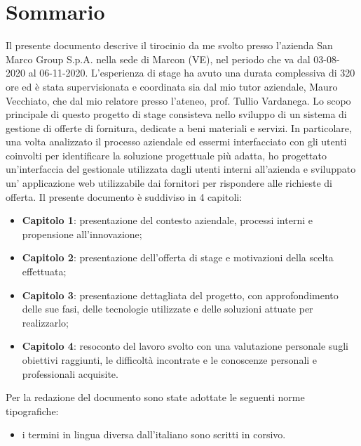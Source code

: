 
\cleardoublepage
{}
{}
\begingroup
\let\clearpage\relax
\let\cleardoublepage\relax
\let\cleardoublepage\relax

\chapter*{Sommario}

Il presente documento descrive il tirocinio da me svolto presso l'azienda San Marco Group S.p.A. nella sede di Marcon (VE), nel periodo che va dal 03-08-2020 al 06-11-2020. L'esperienza di stage ha avuto una durata complessiva di 320 ore ed è stata supervisionata e coordinata sia dal mio tutor aziendale, Mauro Vecchiato, che dal mio relatore presso l'ateneo, prof. Tullio Vardanega. Lo scopo principale di questo progetto di stage consisteva nello sviluppo di un sistema di gestione di offerte di fornitura, dedicate a beni materiali e servizi. In particolare, una volta analizzato il processo aziendale ed essermi interfacciato con gli utenti coinvolti per identificare la soluzione progettuale più adatta, ho progettato un'interfaccia del gestionale utilizzata dagli utenti interni all'azienda e sviluppato un' applicazione web utilizzabile dai fornitori per rispondere alle richieste di offerta.
Il presente documento è suddiviso in 4 capitoli:
\begin{itemize}
	\item \textbf{Capitolo 1}: presentazione del contesto aziendale, processi interni e propensione all'innovazione;
	\item \textbf{Capitolo 2}: presentazione dell'offerta di stage e motivazioni della scelta effettuata; 
	\item \textbf{Capitolo 3}: presentazione dettagliata del progetto, con approfondimento delle sue fasi, delle tecnologie utilizzate e delle soluzioni attuate per realizzarlo;
	\item \textbf{Capitolo 4}: resoconto del lavoro svolto con una valutazione personale sugli obiettivi raggiunti, le difficoltà incontrate e le conoscenze personali e professionali acquisite.
\end{itemize}
Per la redazione del documento sono state adottate le seguenti norme tipografiche:
\begin{itemize}
\item i termini in lingua diversa dall'italiano sono scritti in corsivo.
\end{itemize}

\vfill
%
%

\endgroup			

\vfill

